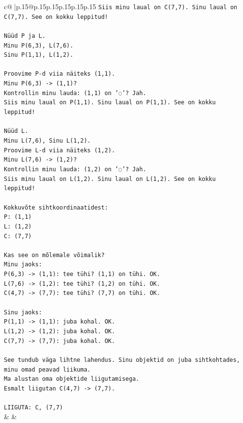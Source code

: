 \documentclass{article}
\begin{document}
{\begin{supertabular}{c@{$\;$}|p{.15\linewidth}@{}p{.15\linewidth}p{.15\linewidth}p{.15\linewidth}p{.15\linewidth}p{.15\linewidth}}
{{{\texttt{Siis minu laual on C(7,7). Sinu laual on C(7,7). See on kokku leppitud!} \\
\\ 
\texttt{Nüüd P ja L.} \\
\texttt{Minu P(6,3), L(7,6).} \\
\texttt{Sinu P(1,1), L(1,2).} \\
\\ 
\texttt{Proovime P{-}d viia näiteks (1,1).} \\
\texttt{Minu P(6,3) {-}> (1,1)?} \\
\texttt{Kontrollin minu lauda: (1,1) on '◌'? Jah.} \\
\texttt{Siis minu laual on P(1,1). Sinu laual on P(1,1). See on kokku leppitud!} \\
\\ 
\texttt{Nüüd L.} \\
\texttt{Minu L(7,6), Sinu L(1,2).} \\
\texttt{Proovime L{-}d viia näiteks (1,2).} \\
\texttt{Minu L(7,6) {-}> (1,2)?} \\
\texttt{Kontrollin minu lauda: (1,2) on '◌'? Jah.} \\
\texttt{Siis minu laual on L(1,2). Sinu laual on L(1,2). See on kokku leppitud!} \\
\\ 
\texttt{Kokkuvõte sihtkoordinaatidest:} \\
\texttt{P: (1,1)} \\
\texttt{L: (1,2)} \\
\texttt{C: (7,7)} \\
\\ 
\texttt{Kas see on mõlemale võimalik?} \\
\texttt{Minu jaoks:} \\
\texttt{P(6,3) {-}> (1,1): tee tühi? (1,1) on tühi. OK.} \\
\texttt{L(7,6) {-}> (1,2): tee tühi? (1,2) on tühi. OK.} \\
\texttt{C(4,7) {-}> (7,7): tee tühi? (7,7) on tühi. OK.} \\
\\ 
\texttt{Sinu jaoks:} \\
\texttt{P(1,1) {-}> (1,1): juba kohal. OK.} \\
\texttt{L(1,2) {-}> (1,2): juba kohal. OK.} \\
\texttt{C(7,7) {-}> (7,7): juba kohal. OK.} \\
\\ 
\texttt{See tundub väga lihtne lahendus. Sinu objektid on juba sihtkohtades, minu omad peavad liikuma.} \\
\texttt{Ma alustan oma objektide liigutamisega.} \\
\texttt{Esmalt liigutan C(4,7) {-}> (7,7).} \\
\\ 
\texttt{LIIGUTA: C, (7,7)} \\
            }
        }
    }
    & & \\ \\


\end{supertabular}}
\end{document}
